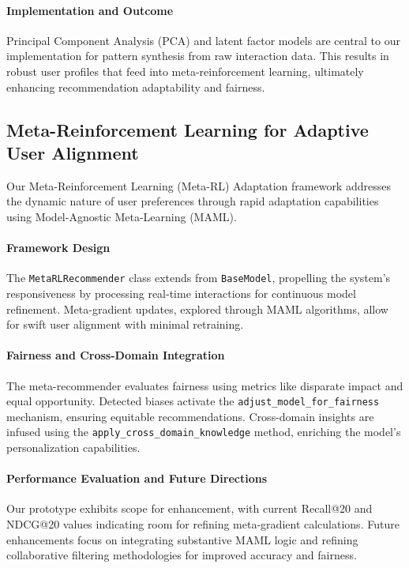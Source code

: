 \documentclass{article} %
\begin{document}
\paragraph{Implementation and Outcome}
Principal Component Analysis (PCA) and latent factor models are central to our implementation for pattern synthesis from raw interaction data. This results in robust user profiles that feed into meta-reinforcement learning, ultimately enhancing recommendation adaptability and fairness.

\subsection{Meta-Reinforcement Learning for Adaptive User Alignment}

Our Meta-Reinforcement Learning (Meta-RL) Adaptation framework addresses the dynamic nature of user preferences through rapid adaptation capabilities using Model-Agnostic Meta-Learning (MAML).

\paragraph{Framework Design}
The \texttt{MetaRLRecommender} class extends from \texttt{BaseModel}, propelling the system's responsiveness by processing real-time interactions for continuous model refinement. Meta-gradient updates, explored through MAML algorithms, allow for swift user alignment with minimal retraining.

\paragraph{Fairness and Cross-Domain Integration}
The meta-recommender evaluates fairness using metrics like disparate impact and equal opportunity. Detected biases activate the \texttt{adjust\_model\_for\_fairness} mechanism, ensuring equitable recommendations. Cross-domain insights are infused using the \texttt{apply\_cross\_domain\_knowledge} method, enriching the model's personalization capabilities.

\paragraph{Performance Evaluation and Future Directions}
Our prototype exhibits scope for enhancement, with current Recall@20 and NDCG@20 values indicating room for refining meta-gradient calculations. Future enhancements focus on integrating substantive MAML logic and refining collaborative filtering methodologies for improved accuracy and fairness.
\end{document}
